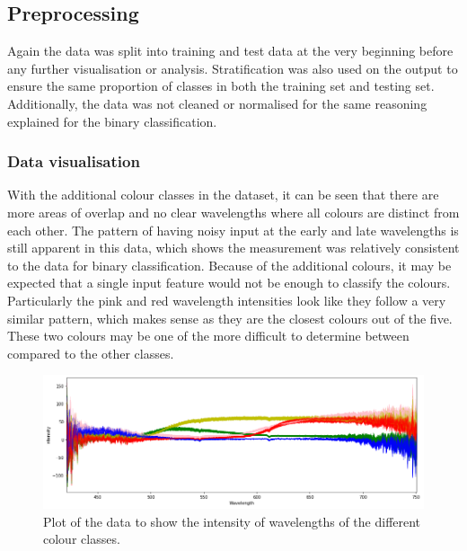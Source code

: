 \documentclass{article}
\begin{document}
\subsection{Preprocessing}
Again the data was split into training and test data at the very beginning before any further visualisation or analysis. Stratification was also used on the output to ensure the same proportion of classes in both the training set and testing set. Additionally, the data was not cleaned or normalised for the same reasoning explained for the binary classification.
\subsubsection{Data visualisation}
With the additional colour classes in the dataset, it can be seen that there are more areas of overlap and no clear wavelengths where all colours are distinct from each other. The pattern of having noisy input at the early and late wavelengths is still apparent in this data, which shows the measurement was relatively consistent to the data for binary classification. Because of the additional colours, it may be expected that a single input feature would not be enough to classify the colours. Particularly the pink and red wavelength intensities look like they follow a very similar pattern, which makes sense as they are the closest colours out of the five. These two colours may be one of the more difficult to determine between compared to the other classes.
\begin{figure}[H]
\centering
\includegraphics[width=1\textwidth, keepaspectratio]{imgs/multiclass-visual.png}
\caption{Plot of the data to show the intensity of wavelengths of the different colour classes.}
\label{fig:multiclass-visualisation}
\end{figure}
\end{document}
